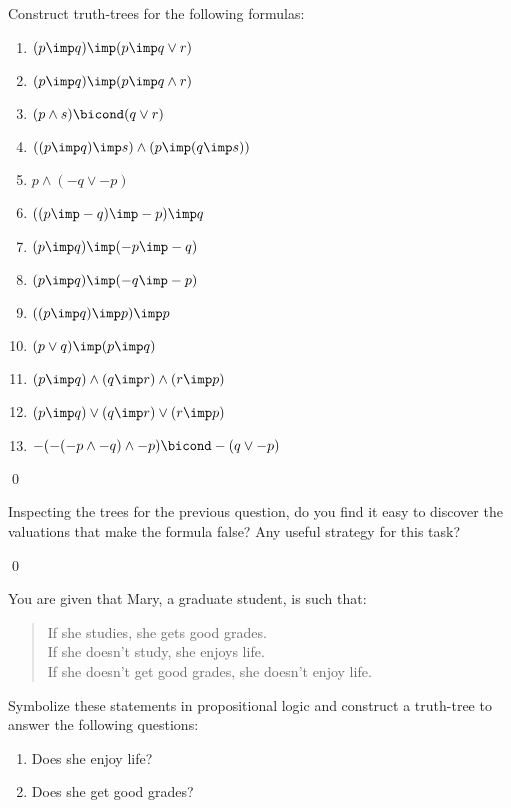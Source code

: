 \documentclass[11pt]{article}
\begin{document}
\begin{itemize}
\hrulefill
\begin{uexercise}\label{treecons}

Construct truth-trees for the following formulas:

\begin{enumerate}
\item $(p\imp q) \imp (p\imp q\lor r)$
\item $(p\imp q) \imp (p\imp q\land r)$
\item $(p\land s) \bicond (q \lor r)$
\item $((p\imp q) \imp s)\land (p\imp (q\imp s))$
\item $p\land (-q\lor -p)$
\item $((p\imp -q) \imp -p) \imp q$
\item $(p\imp q) \imp (-p \imp -q)$
\item $(p\imp q) \imp (-q \imp -p)$
\item $((p\imp q)\imp p) \imp p$
\item $(p\lor q) \imp (p\imp q)$
\item $(p\imp q) \land (q\imp r) \land (r\imp p)$
\item $(p\imp q) \lor (q\imp r) \lor (r\imp p)$
\item $-(-(-p\land -q)\land -p)\bicond -(q\lor -p)$

\end{enumerate}
\qed
\end{uexercise}

\begin{uexercise}\label{treeconsfol}
Inspecting the trees for the previous question, do you find it easy to discover
the valuations that make the formula false? Any useful strategy for this task?

\qed
\end{uexercise}

\begin{uexercise}\label{treeconsfol}
You are given that Mary, a graduate student, is such that:

\begin{quote}\small
If she studies, she  gets good grades.\\
If she doesn't study, she enjoys life.\\
If she doesn't get good grades, she doesn't enjoy life.
\end{quote}

Symbolize these statements in propositional logic and construct a truth-tree to
answer the following questions:

\begin{enumerate}
\item Does she enjoy life?
\item Does she get good grades?
\end{enumerate}


\end{uexercise}
\end{itemize}
\end{document}
